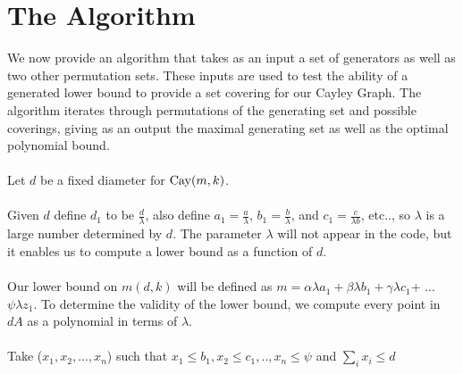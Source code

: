 

\section{The Algorithm}

We now provide an algorithm that takes as an input a set of generators as well as two other permutation sets. These inputs are used to test the ability of a generated lower bound to provide a set covering for our Cayley Graph. The algorithm iterates through permutations of the generating set and possible coverings, giving as an output the maximal generating set as well as the optimal polynomial bound.
\\ \\
Let $d$ be a fixed diameter for $\operatorname{Cay}(m, k)$.
\\ \\
Given $d$ define $d_{1}$ to be $\frac{d}{\lambda}$, also define $a_{1} = \frac{a}{\lambda}$, $b_{1} = \frac{b}{\lambda}$, and $c_{1} = \frac{c}{\lambda b}$, etc.., so $\lambda$ is a large number determined by $d$. The parameter $\lambda$ will not appear in the code, but it enables us to compute a lower bound as a function of $d$.
\\ \\
Our lower bound on $m(d, k)$ will be defined as $m =\alpha \lambda a_{1} + \beta \lambda b_{1} + \gamma \lambda c_{1}$+ ... $\psi \lambda z_{1}$.  To determine the validity of the lower bound, we compute every point in $dA$ as a polynomial in terms of $\lambda$.
\\ \\
Take ($x_{1}, x_{2}, ... , x_{n}$) such that $x_{1} \leq b_{1}, x_{2} \leq c_{1}, .. , x_{n} \leq \psi$ and $\sum_{i} x_{i} \leq d$ %
\\ \\
